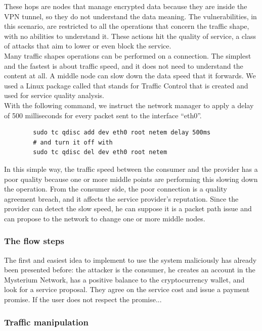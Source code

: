 \documentclass[]{article}
\begin{document}
	These hops are nodes that manage encrypted data because they are inside the VPN tunnel, so they do not understand the data meaning. The vulnerabilities, in this scenario, are restricted to all the operations that concern the traffic shape, with no abilities to understand it. These actions hit the quality of service, a class of attacks that aim to lower or even block the service.\\
	Many traffic shapes operations can be performed on a connection. The simplest and the fastest is about traffic speed, and it does not need to understand the content at all. A middle node can slow down the data speed that it forwards. We used a Linux package called  \cite{tc} that stands for Traffic Control that is created and used for service quality analysis.\\

	With the following command, we instruct the network manager to apply a delay of 500 milliseconds for every packet sent to the interface ``eth0''.\\
	
	\begin{verbatim}
		sudo tc qdisc add dev eth0 root netem delay 500ms
		# and turn it off with
		sudo tc qdisc del dev eth0 root netem
	\end{verbatim}

	In this simple way, the traffic speed between the consumer and the provider has a poor quality because one or more middle points are performing this slowing down the operation. From the consumer side, the poor connection is a quality agreement breach, and it affects the service provider's reputation. Since the provider can detect the slow speed, he can suppose it is a packet path issue and can propose to the network to change one or more middle nodes. 

	\subsubsection{The flow steps}
	The first and easiest idea to implement to use the system maliciously has already been presented before: the attacker is the consumer, he creates an account in the Mysterium Network, has a positive balance to the cryptocurrency wallet, and look for a service proposal. They agree on the service cost and issue a payment promise. If the user does not respect the promise...

	\subsubsection{Traffic manipulation}
\end{document}
